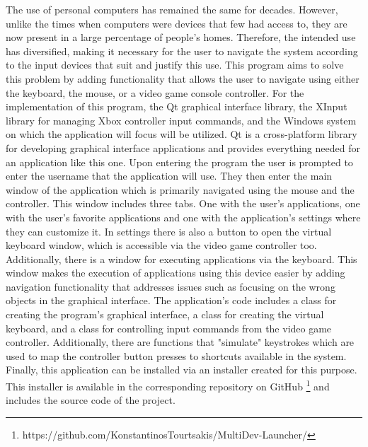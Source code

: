 







The use of personal computers has remained the same for decades. However, unlike the times when 
computers were devices that few had access to, they are now present in a large percentage of 
people's homes. Therefore, the intended use has diversified, making it necessary for the user 
to navigate the system according to the input devices that suit and justify this use. This 
program aims to solve this problem by adding functionality that allows the user to navigate 
using either the keyboard, the mouse, or a video game console controller. For the implementation 
of this program, the Qt graphical interface library, the XInput library for managing Xbox 
controller input commands, and the Windows system on which the application will focus will be 
utilized. Qt is a cross-platform library for developing graphical interface applications and 
provides everything needed for an application like this one. Upon entering the program the user is 
prompted to enter the username that the application will use. They then enter the main window 
of the application which is primarily navigated using the mouse and the controller. This window 
includes three tabs. One with the user's applications, one with the user's favorite applications and 
one with the application's settings where they can customize it. In settings there is also 
a button to open the virtual keyboard window, which is accessible via the video game controller too. 
Additionally, there is a window for executing applications via the keyboard. This window makes 
the execution of applications using this device easier by adding navigation functionality that addresses 
issues such as focusing on the wrong objects in the graphical interface. The application's code 
includes a class for creating the program's graphical interface, a class for creating the virtual 
keyboard, and a class for controlling input commands from the video game controller. Additionally, 
there are functions that "simulate" keystrokes which are used to map the controller button presses 
to shortcuts available in the system. Finally, this application can be installed via an installer 
created for this purpose. This installer is available in the corresponding repository on 
GitHub \footnote{https://github.com/KonstantinosTourtsakis/MultiDev-Launcher/} and includes the source 
code of the project.